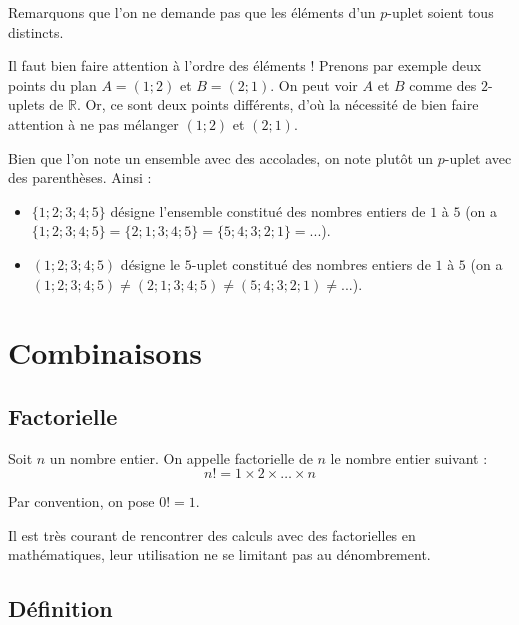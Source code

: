 	Remarquons que l'on ne demande pas que les éléments d'un $p$-uplet soient tous distincts.

	\begin{tip}
		Il faut bien faire attention à l'ordre des éléments ! Prenons par exemple deux points du plan $A = (1; 2)$ et $B = (2; 1)$.
		\newpar
		On peut voir $A$ et $B$ comme des $2$-uplets de $\mathbb{R}$. Or, ce sont deux points différents, d'où la nécessité de bien faire attention à ne pas mélanger $(1; 2)$ et $(2; 1)$.
	\end{tip}

	\begin{tip}[Notation]
		Bien que l'on note un ensemble avec des accolades, on note plutôt un $p$-uplet avec des parenthèses. Ainsi :
		\begin{itemize}
			\item $\{1; 2; 3; 4; 5\}$ désigne l'ensemble constitué des nombres entiers de $1$ à $5$ (on a $\{1; 2; 3; 4; 5\} = \{2; 1; 3; 4; 5\} = \{5; 4; 3; 2; 1\} = ...$).
			\item $(1; 2; 3; 4; 5)$ désigne le $5$-uplet constitué des nombres entiers de $1$ à $5$ (on a $(1; 2; 3; 4; 5) \neq (2; 1; 3; 4; 5) \neq (5; 4; 3; 2; 1) \neq ...$).
		\end{itemize}
	\end{tip}

	\section{Combinaisons}

	\subsection{Factorielle}

	\begin{formula}[Définition]
		Soit $n$ un nombre entier. On appelle factorielle de $n$ le nombre entier suivant :
		\[ n! = 1 \times 2 \times \dots \times n \]
	\end{formula}

	\begin{tip}[Convention]
		Par convention, on pose $0! = 1$.
	\end{tip}

	Il est très courant de rencontrer des calculs avec des factorielles en mathématiques, leur utilisation ne se limitant pas au dénombrement.

	\subsection{Définition}

